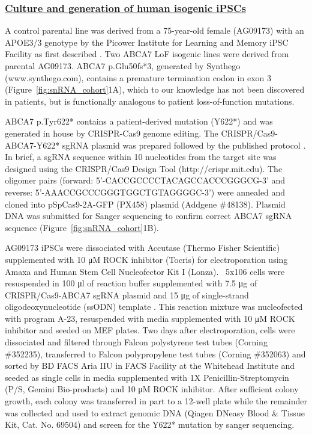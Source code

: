 \subsubsection{\underline{Culture and generation of human isogenic iPSCs}} 

A control parental line was derived from a 75-year-old female (AG09173) with an APOE3/3 genotype by the Picower Institute for Learning and Memory iPSC Facility as first described \cite{Lin2018-ma}. Two ABCA7 LoF isogenic lines were derived from parental AG09173. ABCA7 p.Glu50fs*3, generated by Synthego (www.synthego.com), contains a premature termination codon in exon 3 (Figure~\ref{fig:snRNA_cohort}1A), which to our knowledge has not been discovered in patients, but is functionally analogous to patient loss-of-function mutations.

ABCA7 p.Tyr622* contains a patient-derived mutation (Y622*) \cite{De_Roeck2019-ee} and was generated in house by CRISPR-Cas9 genome editing. The CRISPR/Cas9-ABCA7-Y622* sgRNA plasmid was prepared followed by the published protocol \cite{Ran2013-sf}. In brief, a sgRNA sequence within 10 nucleotides from the target site was designed using the CRISPR/Cas9 Design Tool (http://crispr.mit.edu). The oligomer pairs (forward: 5’-CACCGCCCCTACAGCCACCCGGGCG-3’ and reverse: 5’-AAACCGCCCGGGTGGCTGTAGGGGC-3’) were annealed and cloned into pSpCas9-2A-GFP (PX458) plasmid (Addgene \#48138). Plasmid DNA was submitted for Sanger sequencing to confirm correct ABCA7 sgRNA sequence (Figure~\ref{fig:snRNA_cohort}1B).

AG09173 iPSCs were dissociated with Accutase (Thermo Fisher Scientific) supplemented with 10 μM ROCK inhibitor (Tocris) for electroporation using Amaxa and Human Stem Cell Nucleofector Kit I (Lonza). ~5x106 cells were resuspended in 100 μl of reaction buffer supplemented with 7.5 μg of CRISPR/Cas9-ABCA7 sgRNA plasmid and 15 μg of single-strand oligodeoxynucleotide (ssODN) template . This reaction mixture was nucleofected with program A-23, resuspended with media supplemented with 10 μM ROCK inhibitor and seeded on MEF plates. Two days after electroporation, cells were dissociated and filtered through Falcon polystyrene test tubes (Corning \#352235), transferred to Falcon polypropylene test tubes (Corning \#352063) and sorted by BD FACS Aria IIU in FACS Facility at the Whitehead Institute and seeded as single cells in media supplemented with 1X Penicillin-Streptomycin (P/S, Gemini Bio-products) and 10 μM ROCK inhibitor. After sufficient colony growth, each colony was transferred in part to a 12-well plate while the remainder was collected and used to extract genomic DNA (Qiagen DNeasy Blood & Tissue Kit, Cat. No. 69504) and screen for the Y622* mutation by sanger sequencing.

